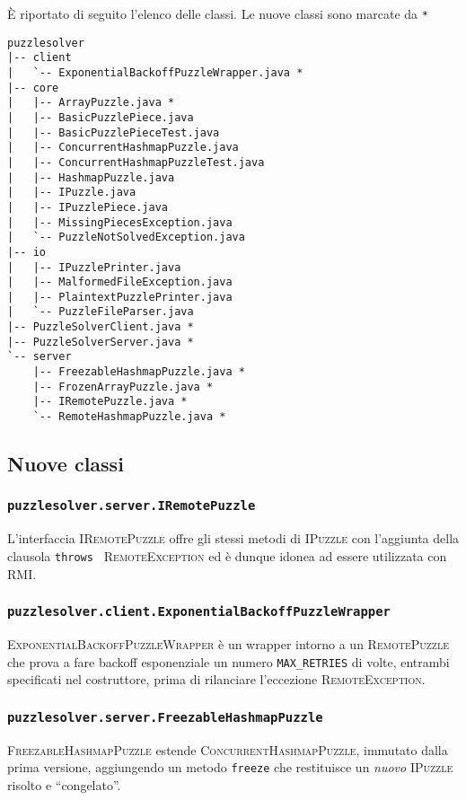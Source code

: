 \documentclass[a4paper]{article}
\newcommand{\Classname}[1]{\textsc{#1}}
\newcommand{\Ifacename}[1]{\textsc{#1}}
\newcommand{\Methodname}[1]{\texttt{#1}}
\begin{document}
\`E riportato di seguito l'elenco delle classi.
Le nuove classi sono marcate da \texttt{*}

\begin{verbatim}
puzzlesolver
|-- client
|   `-- ExponentialBackoffPuzzleWrapper.java *
|-- core
|   |-- ArrayPuzzle.java *
|   |-- BasicPuzzlePiece.java
|   |-- BasicPuzzlePieceTest.java
|   |-- ConcurrentHashmapPuzzle.java
|   |-- ConcurrentHashmapPuzzleTest.java
|   |-- HashmapPuzzle.java
|   |-- IPuzzle.java
|   |-- IPuzzlePiece.java
|   |-- MissingPiecesException.java
|   `-- PuzzleNotSolvedException.java
|-- io
|   |-- IPuzzlePrinter.java
|   |-- MalformedFileException.java
|   |-- PlaintextPuzzlePrinter.java
|   `-- PuzzleFileParser.java
|-- PuzzleSolverClient.java *
|-- PuzzleSolverServer.java *
`-- server
    |-- FreezableHashmapPuzzle.java *
    |-- FrozenArrayPuzzle.java *
    |-- IRemotePuzzle.java *
    `-- RemoteHashmapPuzzle.java *
\end{verbatim}

\subsection{Nuove classi}
\subsubsection{\texttt{puzzlesolver.server.IRemotePuzzle}}
L'interfaccia \Ifacename{IRemotePuzzle} offre gli stessi metodi di \Ifacename{IPuzzle} con l'aggiunta della clausola \texttt{throws } \Ifacename{RemoteException} ed \`e dunque idonea ad essere utilizzata con RMI.
\subsubsection{\texttt{puzzlesolver.client.ExponentialBackoffPuzzleWrapper}}
\Classname{ExponentialBackoffPuzzleWrapper} \`e un wrapper intorno a un \Ifacename{RemotePuzzle} che prova a fare backoff esponenziale un numero \texttt{MAX\_RETRIES} di volte, entrambi specificati nel costruttore, prima di rilanciare l'eccezione \Classname{RemoteException}.
\subsubsection{\texttt{puzzlesolver.server.FreezableHashmapPuzzle}}
\Classname{FreezableHashmapPuzzle} estende \Classname{ConcurrentHashmapPuzzle}, immutato dalla prima versione, aggiungendo un metodo \Methodname{freeze} che restituisce un \emph{nuovo} \Ifacename{IPuzzle} risolto e ``congelato''.
\end{document}
